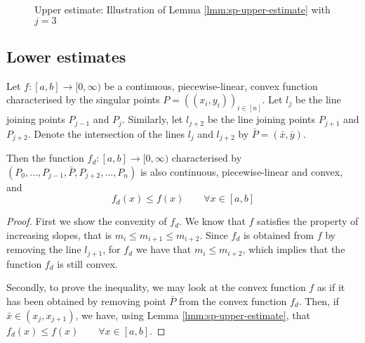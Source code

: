 \begin{figure}
	
	\caption{Upper estimate: Illustration of Lemma \ref{lmm:sp-upper-estimate} with $ j = 3 $}
	\label{fig:upper-estimate}
\end{figure}



\subsection{Lower estimates}
\label{sec:sp-lower-estimates}

\begin{lmm}
	\label{lmm:sp-lower-estimate}
	Let $ f:[a,b] \to [0, \infty) $ be a continuous, piecewise-linear, convex function characterised by the singular points $ P = ( (x_i, y_i) )_{i \in [n]} $. Let $ l_{j} $ be the line joining points $ P_{j-1} $ and $ P_{j} $. Similarly, let $ l_{j+2} $ be the line joining points $ P_{j+1} $ and $ P_{j+2} $. Denote the intersection of the lines $ l_{j} $ and $ l_{j+2} $ by $ \bar{P} = ( \bar{x}, \bar{y} ) $.
	
	Then the function $ f_d: [a,b] \to [0, \infty) $ characterised by $ (P_0, \dots, P_{j-1}, \bar{P}, P_{j+2}, \dots, P_n) $ is also continuous, piecewise-linear and convex, and
	\begin{equation}
		f_d(x) \leq f(x) \qquad \forall x \in [a,b]
	\end{equation}
\end{lmm}

\begin{proof}
	First we show the convexity of $f_d$. We know that $f$ satisfies the property of increasing slopes, that is $ m_{i} \leq m_{i+1} \leq m_{i+2} $. Since $f_d$ is obtained from $f$ by removing the line $l_{j+1}$, for $f_d$ we have that $ m_{i} \leq m_{i+2} $, which implies that the function $f_d$ is still convex.
	
	Secondly, to prove the inequality, we may look at the convex function $f$ as if it has been obtained by removing point $ \bar{P} $ from the convex function $f_d$. Then, if $ \bar{x} \in ( x_{j} , x_{j+1} ) $, we have, using Lemma \ref{lmm:sp-upper-estimate}, that $ f_d(x) \leq f(x) \qquad \forall x \in [a,b] $.
\end{proof}

